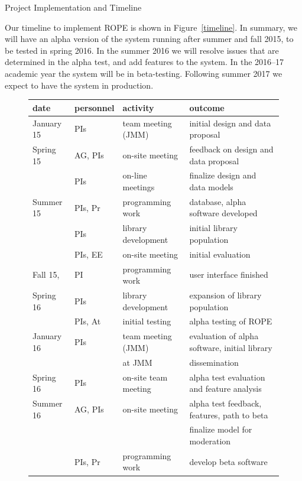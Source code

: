 \documentclass[11pt]{article}
\begin{document}
\begin{section}{Project Implementation and Timeline}

Our timeline to implement ROPE is shown in Figure~\ref{timeline}.  In
summary, we will have an alpha version of the system running after summer
and fall 2015, to be tested in spring 2016.  In the summer 2016 we
will resolve issues that are determined in the alpha test, and add
features to the system.  In the 2016--17 academic year the system will be
in beta-testing.  Following summer 2017 we expect to have the system in
production. 

\begin{figure}
\begin{center}
\begin{tabular}{|l|l|l|l|}
  \hline
  \textbf{date} & \textbf{personnel} & \textbf{activity} & \textbf{outcome}\\
  \hline
  \hline
  January 15 & PIs & team meeting (JMM) & initial design and data proposal\\
  \hline
  Spring 15 & AG, PIs & on-site meeting
	& feedback on design and data proposal\\
	& PIs & on-line meetings & finalize design and data models\\
  \hline
  Summer 15 & PIs, Pr & programming work & database, alpha
	software developed \\ 
	& PIs & library development & initial library population \\
	& PIs, EE & on-site meeting & initial evaluation \\
  \hline
  Fall 15, & PI & programming work & user interface finished \\ 
  Spring 16 & PIs & library development & expansion of library population \\
	& PIs, At & initial testing & alpha testing of ROPE \\
  \hline 
  January 16 & PIs & team meeting (JMM) & evaluation of alpha software,
	initial library \\
        &  & at JMM & dissemination \\
  \hline
  Spring 16 & PIs & on-site team meeting & alpha test evaluation and
        feature analysis \\
  \hline
  Summer 16 & AG, PIs & on-site meeting &
 	alpha test feedback, features, path to beta \\
	& & & finalize model for moderation \\
	& PIs, Pr & programming work & develop beta software \\

\end{tabular}
\end{center}
\end{figure}
\end{section}
\end{document}
